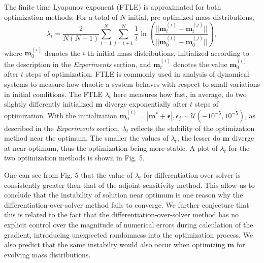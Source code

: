 \documentclass[conference]{IEEEtran}
\begin{document}
The finite time Lyapunov exponent (FTLE) is approximated for both optimization methods:
For a total of $N$ initial, pre-optimized mass distributions, 
\[
\lambda_t = \frac{2}{N(N-1)} \sum_{i=1}^N \sum_{j=i+1}^N \frac{1}{t}
\ln\left(\frac{||\mathbf{m}^{(i)}_t - \mathbf{m}^{(j)}_t||}
{||\mathbf{m}^{(i)}_0 - \mathbf{m}^{(j)}_0||}\right),
\]
where $\mathbf{m}^{(i)}_0$ denotes the $i$-th initial mass distributions, 
initialized according to the description in the \textit{Experiments} section, and 
$\mathbf{m}^{(i)}_t$ denotes the value $\mathbf{m}^{(i)}_0$ after 
$t$ steps of optimization. FTLE is commonly used in analysis of dynamical systems 
to measure how chaotic a system behaves with respect to small variations in initial 
conditions. The FTLE $\lambda_t$ here measures how fast, in average, do two 
slightly differently initialized $\mathbf{m}$ diverge exponentially after $t$ 
steps of optimization. With the initialization 
$\mathbf{m}^{(i)}_0 = |\mathbf{m}^* + \boldsymbol{\epsilon}|,
\epsilon_j \sim \mathcal{U}(-10^{-5}, 10^{-5})$, as described in the
\textit{Experiments} section, $\lambda_t$ reflects the stability of 
the optimization method near the optimum. The smaller the values of $\lambda_t$, 
the lesser do $\mathbf{m}$ diverge at near optimum, thus the optimization 
being more stable. A plot of $\lambda_t$ for the two optimization methods is shown 
in Fig. 5. 

One can see from Fig. 5 that the value of $\lambda_t$ for 
differentiation over solver is consistently greater then that 
of the adjoint sensitivity method. This allow us to conclude that 
the instability of solution near optimum is one reason why the 
differentiation-over-solver method fails to converge. We further 
conjecture that this is related to the fact that the 
differentiation-over-solver method has no explicit control over the magnitude 
of numerical errors during calculation of the gradient, introducing 
unexpected randomness into the optimization process. We also predict 
that the same instabilty would also occur when optimizing $\mathbf{m}$ 
for evolving mass distributions. 
\end{document}
